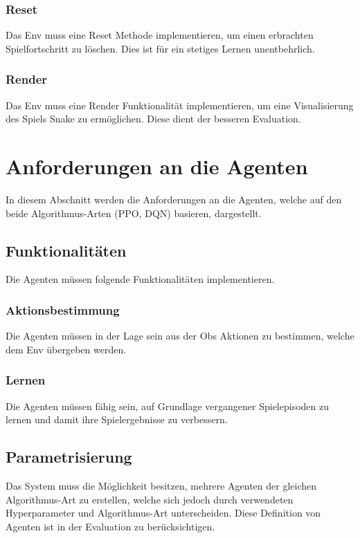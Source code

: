 \subsubsection{Reset} \label{sec:Anforderung_Reset}
Das Env muss eine Reset Methode implementieren, um einen erbrachten Spielfortschritt zu löschen. Dies ist für ein stetiges Lernen unentbehrlich.

\subsubsection{Render} \label{sec:visualisierung_Env}
Das Env muss eine Render Funktionalität implementieren, um eine Visualisierung des Spiels Snake zu ermöglichen. Diese dient der besseren Evaluation.

\section{Anforderungen an die Agenten}
In diesem Abschnitt werden die Anforderungen an die Agenten, welche auf den beide Algorithmus-Arten (PPO, DQN) basieren, dargestellt.

\subsection{Funktionalitäten} \label{sec:Agent_Funktionalitäten}
Die Agenten müssen folgende Funktionalitäten implementieren.

\subsubsection{Aktionsbestimmung}
Die Agenten müssen in der Lage sein aus der Obs Aktionen zu bestimmen, welche dem Env übergeben werden.

\subsubsection{Lernen}
Die Agenten müssen fähig sein, auf Grundlage vergangener Spielepisoden zu lernen und damit ihre Spielergebnisse zu verbessern.

\subsection{Parametrisierung} \label{sec:Parametrisierung}
Das System muss die Möglichkeit besitzen, mehrere Agenten der gleichen Algorithmus-Art zu erstellen, welche sich jedoch durch verwendeten Hyperparameter und Algorithmus-Art unterscheiden. Diese Definition von Agenten ist in der Evaluation zu berücksichtigen.

